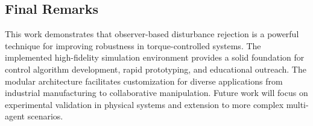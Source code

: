 \subsection{Final Remarks}
This work demonstrates that observer-based disturbance rejection is a powerful technique for improving robustness in torque-controlled systems. The implemented high-fidelity simulation environment provides a solid foundation for control algorithm development, rapid prototyping, and educational outreach. The modular architecture facilitates customization for diverse applications from industrial manufacturing to collaborative manipulation. Future work will focus on experimental validation in physical systems and extension to more complex multi-agent scenarios.
